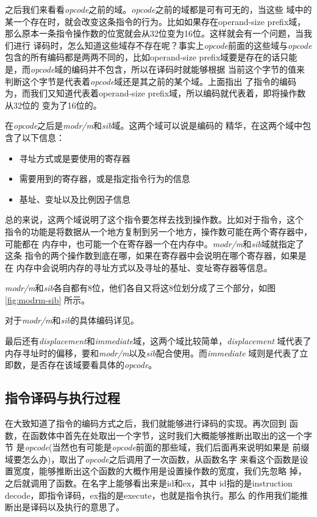 之后我们来看看\emph{opcode}之前的域。\emph{opcode}之前的域都是可有可无的，当这些
域中的某一个存在时，就会改变这条指令的行为。比如如果存在operand-size prefix域，
那么原本一条指令操作数的位宽就会从32位变为16位。这样就会有一个问题，当我们进行
译码时，怎么知道这些域存不存在呢？事实上\emph{opcode}前面的这些域与\emph{opcode}
包含的所有编码都是两两不同的，比如operand-size prefix域要是存在的话只能
是，而\emph{opcode}域的编码并不包含，所以在译码时就能够根据
当前这个字节的值来判断这个字节是代表着\emph{opcode}域还是其之前的某个域。上面指出
了指令的编码为，而我们又知道代表着operand-size
prefix域，所以编码就代表着，即将操作数从32位的
变为了16位的。

在\emph{opcode}之后是\emph{modr/m}和\emph{sib}域。这两个域可以说是\arch 编码的
精华，在这两个域中包含了以下信息：
\begin{itemize}
  \item 寻址方式或是要使用的寄存器
  \item 需要用到的寄存器，或是指定指令行为的信息
  \item 基址、变址以及比例因子信息
\end{itemize}

总的来说，这两个域说明了这个指令要怎样去找到操作数。比如对于指令，这个
指令的功能是将数据从一个地方复制到另一个地方，操作数可能在两个寄存器中，可能都在
内存中，也可能一个在寄存器一个在内存中。\emph{modr/m}和\emph{sib}域就指定了这条
指令的两个操作数到底在哪，如果在寄存器中会说明在哪个寄存器，如果是在
内存中会说明内存的寻址方式以及寻址的基址、变址寄存器等信息。

\emph{modr/m}和\emph{sib}各自都有8位，他们各自又将这8位划分成了三个部分，如图\ref{fig:modrm-sib}
所示。


对于\emph{modr/m}和\emph{sib}的具体编码详见\cite{i386-manual}。

最后还有\emph{displacement}和\emph{immediate}域，这两个域比较简单，\emph{displacement}
域代表了内存寻址时的偏移，要和\emph{modr/m}以及\emph{sib}配合使用。而\emph{immediate}
域则是代表了立即数，是否存在该域要看具体的\emph{opcode}。

\subsection{\arch 指令译码与执行过程}
在大致知道了\arch 指令的编码方式之后，我们就能够进行译码的实现。再次回到
函数，在函数体中首先在\pc 处取出一个字节，这时我们大概能够推断出取出的这一个字节
是\emph{opcode}(当然也有可能是\emph{opcode}前面的那些域，我们后面再来说明如果是
前缀域要怎么办)，取出了\emph{opcode}之后调用了一次函数，从函数名字
来看这个函数是设置宽度，能够推断出这个函数的大概作用是设置操作数的宽度，我们先忽略
掉，之后就调用了函数。在名字上能够看出来是id和ex，其中
id指的是instruction decode，即指令译码，ex指的是execute，也就是指令执行。那么
的作用我们能推断出是译码以及执行的意思了。

